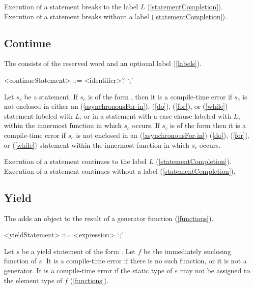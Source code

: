 \documentclass[makeidx]{article}
\begin{document}
{\LMHash{}%
Execution of a \BREAK{} statement  breaks to the label $L$
(\ref{statementCompletion}).
Execution of a \BREAK{} statement \code{\BREAK;} breaks without a label
(\ref{statementCompletion}).


\subsection{Continue}

\LMHash{}%
The  consists of the reserved word \CONTINUE{}
and an optional label (\ref{labels}).

\begin{grammar}
<continueStatement> ::= \CONTINUE{} <identifier>? `;'
\end{grammar}

\LMHash{}%
Let $s_c$ be a \CONTINUE{} statement.
If $s_c$ is of the form ,
then it is a compile-time error if $s_c$ is not enclosed in either an
\code{\AWAIT{} \FOR} (\ref{asynchronousFor-in}),
\DO{} (\ref{do}), \FOR{} (\ref{for}), or \WHILE{} (\ref{while})
statement labeled with $L$, or in a \SWITCH{} statement with a case clause
labeled with $L$, within the innermost function in which $s_c$ occurs.
If $s_c$ is of the form \code{\CONTINUE;}
then it is a compile-time error if $s_c$ is not enclosed in an
\code{\AWAIT{} \FOR} (\ref{asynchronousFor-in})
\DO{} (\ref{do}), \FOR{} (\ref{for}), or \WHILE{} (\ref{while}) statement
within the innermost function in which $s_c$ occurs.

\LMHash{}%
Execution of a \CONTINUE{} statement  continues
to the label $L$ (\ref{statementCompletion}).
Execution of a \CONTINUE{} statement \code{\CONTINUE;} continues
without a label (\ref{statementCompletion}).


\subsection{Yield}

\LMHash{}%
The  adds an object to
the result of a generator function
(\ref{functions}).

\begin{grammar}
<yieldStatement> ::= \YIELD{} <expression> `;'
\end{grammar}

\LMHash{}%
Let $s$ be a yield statement of the form .
Let $f$ be the immediately enclosing function of $s$.
It is a compile-time error if there is no such function,
or it is not a generator.
It is a compile-time error if the static type of $e$
may not be assigned to the element type of $f$
(\ref{functions}).

}
\end{document}
